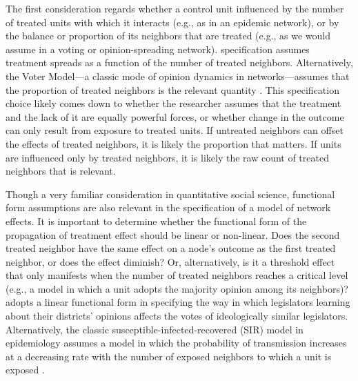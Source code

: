 \documentclass[12pt]{article}
\begin{document}
The first consideration regards whether a control unit influenced by the number of treated units with which it interacts (e.g., as in an epidemic network), or by the balance or proportion of its neighbors that are treated (e.g., as we would assume in a voting or opinion-spreading network). \citet{bowers2012reasoning} specification assumes treatment spreads as a function of the number of treated neighbors. Alternatively, the Voter Model---a classic mode of opinion dynamics in networks---assumes that the proportion of treated neighbors is the relevant quantity \citep{valentini2014self}. This specification choice likely comes down to whether the researcher assumes that the treatment and the lack of it are equally powerful forces, or whether change in the outcome can only result from exposure to treated units. If untreated neighbors can offset the effects of treated neighbors, it is likely the proportion that matters. If units are influenced only by treated neighbors, it is likely the raw count of treated neighbors that is relevant. 

Though a very familiar consideration in quantitative social science, functional form assumptions are also relevant in the specification of a model of network effects. It is important to determine whether the functional form of the propagation of treatment effect should be linear or non-linear. Does the second treated neighbor have the same effect on a node's outcome as the first treated neighbor, or does the effect diminish? Or, alternatively, is it a threshold effect that only manifests when the number of treated neighbors reaches a critical level (e.g., a model in which a unit adopts the majority opinion among its neighbors)? \citet{coppock2014information} adopts a linear functional form in specifying the way in which legislators learning about their districts' opinions affects the votes of ideologically similar legislators. Alternatively, the classic susceptible-infected-recovered (SIR) model in epidemiology assumes a model in which the probability of transmission increases at a decreasing rate with the number of exposed neighbors to which a unit is exposed \citep{dodds2004universal}.


\end{document}
